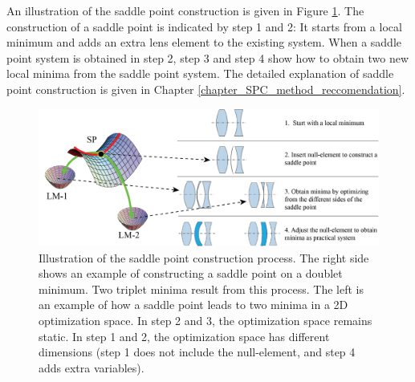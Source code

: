 An illustration of the saddle point construction is given in Figure \ref{fig: spc_illustration}. The construction of a saddle point is indicated by step 1 and 2: It starts from a local minimum and adds an extra lens element to the existing system. When a saddle point system is obtained in step 2, step 3 and step 4 show how to obtain two new local minima from the saddle point system. The detailed explanation of saddle point construction is given in Chapter \ref{chapter_SPC_method_reccomendation}. 

\begin{figure}
    \centering
    \includegraphics[scale=0.58]{chapter-1/figures/spc_illustrate.png}
    \caption{Illustration of the saddle point construction process. The right side shows an example of constructing a saddle point on a doublet minimum. Two triplet minima result from this process. The left is an example of how a saddle point leads to two minima in a 2D optimization space. In step 2 and 3, the optimization space remains static. In step 1 and 2, the optimization space has different dimensions (step 1 does not include the null-element, and step 4 adds extra variables). }
    \label{fig: spc_illustration}
\end{figure} 



